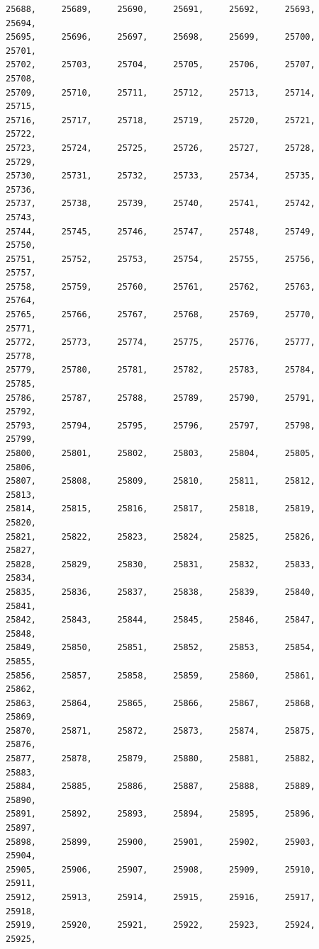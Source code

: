 \documentclass[a4paper,11pt]{report}
\begin{document}
\begin{verbatim}
25688,     25689,     25690,     25691,     25692,     25693,     25694,     
25695,     25696,     25697,     25698,     25699,     25700,     25701,     
25702,     25703,     25704,     25705,     25706,     25707,     25708,     
25709,     25710,     25711,     25712,     25713,     25714,     25715,     
25716,     25717,     25718,     25719,     25720,     25721,     25722,     
25723,     25724,     25725,     25726,     25727,     25728,     25729,     
25730,     25731,     25732,     25733,     25734,     25735,     25736,     
25737,     25738,     25739,     25740,     25741,     25742,     25743,     
25744,     25745,     25746,     25747,     25748,     25749,     25750,     
25751,     25752,     25753,     25754,     25755,     25756,     25757,     
25758,     25759,     25760,     25761,     25762,     25763,     25764,     
25765,     25766,     25767,     25768,     25769,     25770,     25771,     
25772,     25773,     25774,     25775,     25776,     25777,     25778,     
25779,     25780,     25781,     25782,     25783,     25784,     25785,     
25786,     25787,     25788,     25789,     25790,     25791,     25792,     
25793,     25794,     25795,     25796,     25797,     25798,     25799,     
25800,     25801,     25802,     25803,     25804,     25805,     25806,     
25807,     25808,     25809,     25810,     25811,     25812,     25813,     
25814,     25815,     25816,     25817,     25818,     25819,     25820,     
25821,     25822,     25823,     25824,     25825,     25826,     25827,     
25828,     25829,     25830,     25831,     25832,     25833,     25834,     
25835,     25836,     25837,     25838,     25839,     25840,     25841,     
25842,     25843,     25844,     25845,     25846,     25847,     25848,     
25849,     25850,     25851,     25852,     25853,     25854,     25855,     
25856,     25857,     25858,     25859,     25860,     25861,     25862,     
25863,     25864,     25865,     25866,     25867,     25868,     25869,     
25870,     25871,     25872,     25873,     25874,     25875,     25876,     
25877,     25878,     25879,     25880,     25881,     25882,     25883,     
25884,     25885,     25886,     25887,     25888,     25889,     25890,     
25891,     25892,     25893,     25894,     25895,     25896,     25897,     
25898,     25899,     25900,     25901,     25902,     25903,     25904,     
25905,     25906,     25907,     25908,     25909,     25910,     25911,     
25912,     25913,     25914,     25915,     25916,     25917,     25918,     
25919,     25920,     25921,     25922,     25923,     25924,     25925,     

\end{verbatim}
\end{document}
